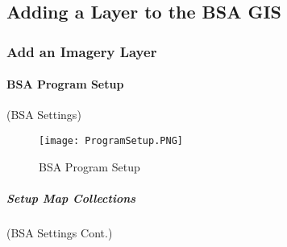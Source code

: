%
%
%
%
% 
\subsection{Adding a Layer to the BSA GIS}

\subsubsection{Add an Imagery Layer}
\vspace{.25in}

%
%
\paragraph[BSA Program Setup ]{\Large BSA Program Setup\texorpdfstring{\\}{}}
(BSA Settings)
\vspace{.25in}

\vspace{.15in}

%
%
\begin{figure}[h!]
\centering
    \texttt{[image: ProgramSetup.PNG]}
\caption{BSA Program Setup}
\end{figure}
\clearpage
%
%
%
\subparagraph[Setup Map Collections]{\Large Setup Map Collections\texorpdfstring{\\}{}}
(BSA Settings Cont.)
\vspace{.5in}

